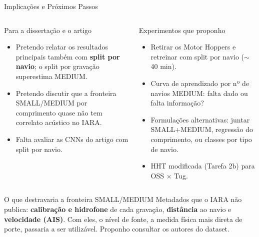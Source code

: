 \documentclass[aspectratio=169]{beamer}
\begin{document}
\begin{frame}{Implicações e Próximos Passos}
    \footnotesize
    \begin{columns}[t]
        \begin{block}{\small Para a dissertação e o artigo}
            \scriptsize
            \begin{itemize}
                \setlength{\itemsep}{1pt}
                \item Pretendo relatar os resultados principais também com \textbf{split por navio}; o split por gravação superestima MEDIUM.
                \item Pretendo discutir que a fronteira SMALL/MEDIUM por comprimento quase não tem correlato acústico no IARA.
                \item Falta avaliar as CNNs do artigo com split por navio.
            \end{itemize}
        \end{block}
        \begin{block}{\small Experimentos que proponho}
            \scriptsize
            \begin{itemize}
                \setlength{\itemsep}{1pt}
                \item Retirar os Motor Hoppers e retreinar com split por navio ($\sim$40 min).
                \item Curva de aprendizado por nº de navios MEDIUM: falta dado ou falta informação?
                \item Formulações alternativas: juntar SMALL+MEDIUM, regressão do comprimento, ou classes por tipo de navio.
                \item HHT modificada (Tarefa 2b) para OSS $\times$ Tug.
            \end{itemize}
        \end{block}
    \end{columns}
    \vspace{0.1cm}
    \begin{alertblock}{O que destravaria a fronteira SMALL/MEDIUM}
        \scriptsize
        Metadados que o IARA não publica: \textbf{calibração e hidrofone} de cada gravação, \textbf{distância} ao navio e \textbf{velocidade (AIS)}. Com eles, o nível de fonte, a medida física mais direta de porte, passaria a ser utilizável. Proponho consultar os autores do dataset.
    \end{alertblock}
\end{frame}
\end{document}
